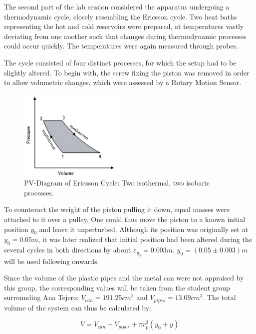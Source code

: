 The second part of the lab session considered the apparatus undergoing a thermodynamic cycle, closely resembling the Ericsson cycle. Two heat baths representing the hot and cold reservoirs were prepared, at temperatures vastly deviating from one another such that changes during thermodynamic processes could occur quickly. The temperatures were again measured through probes. 

The cycle consisted of four distinct processes, for which the setup had to be slightly altered. To begin with, the screw fixing the piston was removed in order to allow volumetric changes, which were assessed by a Rotary Motion Sensor. 

\begin{figure}  %
    \centering
    \includegraphics[width=0.45\textwidth]{Graphics/Ericsson_Cycle.png}  %
    \caption{PV-Diagram of Ericsson Cycle: Two isothermal, two isobaric processes.}
    \label{fig:Ericsson Cycle}
\end{figure}

To counteract the weight of the piston pulling it down, equal masses were attached to it over a pulley. One could thus move the piston to a known initial position $\mathit{y_0}$ and leave it unperturbed. Although its position was originally set at $\mathit{y_0} = 0.05 m$, it was later realized that initial position had been altered during the several cycles in both directions by about $\mathit{\varepsilon_{y_0}= 0.003m}$. $\mathit{y_0 = (0.05 \pm 0.003) m}$ will be used following onwards. 

Since the volume of the plastic pipes and the metal can were not appraised by this group, the corresponding values will be taken from the student group surrounding Ana Tejero: $\mathit{V_{can} = 191.25 cm^3}$ and $\mathit{V_{pipes} = 13.09 cm^3}$. The total volume of the system can thus be calculated by:

\begin{equation}
\label{eq:Volume}
    \mathit{V = V_{can} + V_{pipes} + \pi r_p^2 (y_0 + y)}
\end{equation}

